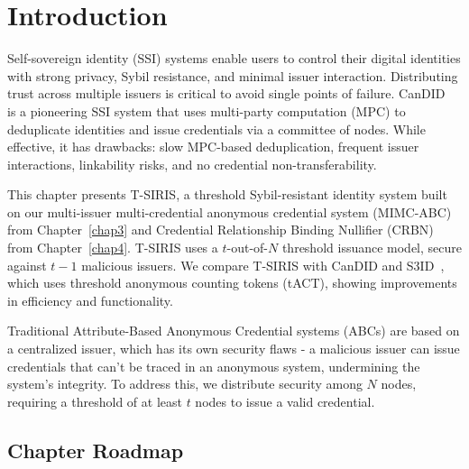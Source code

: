 \label{chap6}

\section{Introduction}\label{sec:threshold-intro}
Self-sovereign identity (SSI) systems enable users to control their digital identities with strong privacy, Sybil resistance, and minimal issuer interaction. Distributing trust across multiple issuers is critical to avoid single points of failure. CanDID~\cite{maram2021candid} is a pioneering SSI system that uses multi-party computation (MPC) to deduplicate identities and issue credentials via a committee of nodes. While effective, it has drawbacks: slow MPC-based deduplication, frequent issuer interactions, linkability risks, and no credential non-transferability.

This chapter presents T-SIRIS, a threshold Sybil-resistant identity system built on our multi-issuer multi-credential anonymous credential system (MIMC-ABC) from Chapter~\ref{chap3} and Credential Relationship Binding Nullifier (CRBN) from Chapter~\ref{chap4}. T-SIRIS uses a $t$-out-of-$N$ threshold issuance model, secure against $t-1$ malicious issuers. We compare T-SIRIS with CanDID and S3ID~\cite{rabaninejad_attribute-based_2024}, which uses threshold anonymous counting tokens (tACT), showing improvements in efficiency and functionality.

Traditional Attribute-Based Anonymous Credential systems (ABCs) are based on a centralized issuer, which has its own security flaws - a malicious issuer can issue credentials that can't be traced in an anonymous system, undermining the system's integrity. To address this, we distribute security among $N$ nodes, requiring a threshold of at least $t$ nodes to issue a valid credential. 

\subsection*{Chapter Roadmap}

